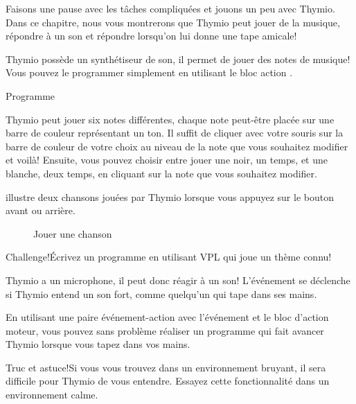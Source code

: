 \label{ch.bells}

Faisons une pause avec les tâches compliquées et jouons un peu avec Thymio. Dans ce chapitre, nous vous montrerons que Thymio peut jouer de la musique, répondre à un son et répondre lorsqu'on lui donne une tape amicale!


Thymio possède un synthétiseur de son, il permet de jouer des notes de musique! Vous pouvez le programmer simplement en utilisant le bloc action .

{\raggedleft \hfill Programme }

Thymio peut jouer six notes différentes, chaque note peut-être placée sur une barre de couleur représentant un ton. Il suffit de cliquer avec votre souris sur la barre de couleur de votre choix au niveau de la note que vous souhaitez modifier et voilà! Ensuite, vous pouvez choisir entre jouer une noir, un temps, et une blanche, deux temps, en cliquant sur la note que vous souhaitez modifier.

 illustre deux chansons jouées par Thymio lorsque vous appuyez sur le bouton avant ou arrière.

\begin{figure}
\begin{center}
\caption{Jouer une chanson}\label{fig.music}
\end{center}
\end{figure}

\begin{bclogo}[couleur = pink!30, arrondi = 0.1, logo = \bccrayon, ombre = true]{Challenge!}Écrivez un programme en utilisant VPL qui joue un thème connu!
\end{bclogo}


Thymio a un microphone, il peut donc réagir à un son! L'événement  se déclenche si Thymio entend un son fort, comme quelqu'un qui tape dans ses mains. 

En utilisant une paire événement-action avec l'événement  et le bloc d'action moteur, vous pouvez sans problème réaliser un programme qui fait avancer Thymio lorsque vous tapez dans vos mains.

\begin{bclogo}[couleur = blue!30, arrondi = 0.1, logo = \bcinfo, ombre = true]{Truc et astuce!}Si vous vous trouvez dans un environnement bruyant, il sera difficile pour Thymio de vous entendre. Essayez cette fonctionnalité dans un environnement calme.
\end{bclogo}

